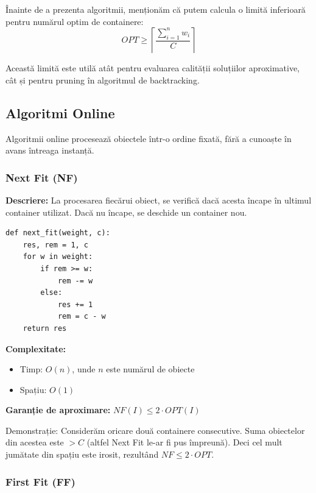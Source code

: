 \documentclass[runningheads]{llncs}
\begin{document}
Înainte de a prezenta algoritmii, menționăm că putem calcula o limită inferioară pentru numărul optim de containere:
\begin{equation}
OPT \geq \left\lceil \frac{\sum_{i=1}^{n} w_i}{C} \right\rceil
\end{equation}

Această limită este utilă atât pentru evaluarea calității soluțiilor aproximative, cât și pentru pruning în algoritmul de backtracking.

\subsection{Algoritmi Online}

Algoritmii online procesează obiectele într-o ordine fixată, fără a cunoaște în avans întreaga instanță.

\subsubsection{Next Fit (NF)}

\textbf{Descriere:} La procesarea fiecărui obiect, se verifică dacă acesta încape în ultimul container utilizat. Dacă nu încape, se deschide un container nou.

\begin{tcolorbox}[BoxBlue, title=\faIcon{code} Implementare Next Fit (Python), fonttitle=\bfseries]
\begin{lstlisting}
def next_fit(weight, c):
    res, rem = 1, c
    for w in weight:
        if rem >= w:
            rem -= w
        else:
            res += 1
            rem = c - w
    return res
\end{lstlisting}
\end{tcolorbox}

\textbf{Complexitate:}
\begin{itemize}
    \item Timp: $O(n)$, unde $n$ este numărul de obiecte
    \item Spațiu: $O(1)$
\end{itemize}

\textbf{Garanție de aproximare:} $NF(I) \leq 2 \cdot OPT(I)$

Demonstrație: Considerăm oricare două containere consecutive. Suma obiectelor din acestea este $> C$ (altfel Next Fit le-ar fi pus împreună). Deci cel mult jumătate din spațiu este irosit, rezultând $NF \leq 2 \cdot OPT$.

\subsubsection{First Fit (FF)}
\end{document}
